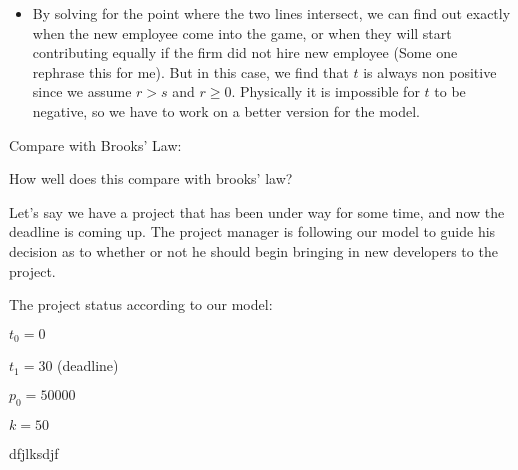 \documentclass{article}
\newenvironment{atomize}
    {\begin{list} {} {
            \setlength\itemindent{0pt}
            \setlength\leftmargin{10pt}
            \setlength\labelwidth{0pt}
    }}
    {\end{list}}
\begin{document}
\begin{atomize}
\begin{itemize}
								\item By solving for the point where the two lines intersect, we
								can find out exactly when the new employee come into the game,
								or when they will start contributing equally if the firm did not
								hire new employee (Some one rephrase this for me). But in this
								case, we find that $t$ is always non positive since we assume
								$r>s$ and $r\geq0$. Physically it is impossible for $t$ to be
								negative, so we have to work on a better version for the model.
            \end{itemize}
				\item Compare with Brooks' Law:
						\begin{atomize}
								\item How well does this compare with brooks' law?
								\item Let's say we have a project that has been under way for
								some time, and now the deadline is coming up. The project
								manager is following our model to guide his decision as to
								whether or not he should begin bringing in new developers to the
								project.
								\item The project status according to our model:
										\begin{atomize}
												\item $t_{0} = 0$
												\item $t_{1} = 30$ (deadline)
												\item $p_{0} = 50000$
												\item $k = 50$
										\end{atomize}
								\item dfjlksdjf
						\end{atomize}
    \end{atomize}
\end{document}
